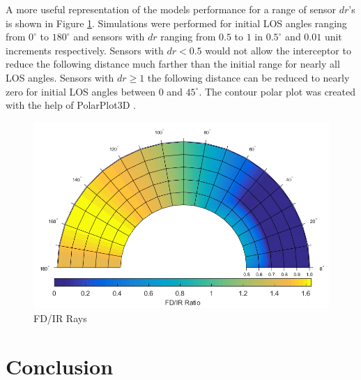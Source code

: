 \documentclass[]{aiaa-tc}%
\begin{document}
A more useful representation of the models performance for a range of sensor $dr$'s is shown in Figure \ref{fig:Polar}. Simulations were performed for initial LOS angles ranging from $0^{\circ}$ to $180^{\circ}$ and sensors with $dr$ ranging from $0.5$ to $1$ in $0.5^{\circ}$ and $0.01$ unit increments respectively. Sensors with $dr < 0.5$ would not allow the interceptor to reduce the following distance much farther than the initial range for nearly all LOS angles. Sensors with $dr \geq 1$ the following distance can be reduced to nearly zero for initial LOS angles between $0$ and $45^{\circ}$. The contour polar plot was created with the help of PolarPlot3D \cite{Polar3d}.

\begin{figure}[H]
	\centering
	\includegraphics[width=10 cm]{correctpolar.png}
	\caption{FD/IR Rays}
	\label{fig:Polar}
\end{figure}

\section{Conclusion}


\end{document}
